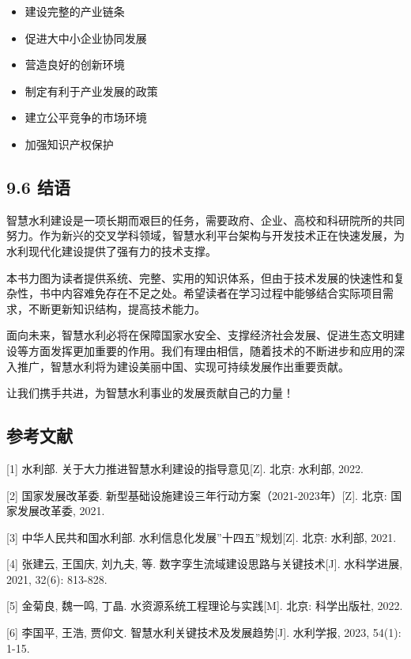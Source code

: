 
\begin{itemize}
\tightlist
\item
  建设完整的产业链条
\item
  促进大中小企业协同发展
\item
  营造良好的创新环境
\end{itemize}


\begin{itemize}
\tightlist
\item
  制定有利于产业发展的政策
\item
  建立公平竞争的市场环境
\item
  加强知识产权保护
\end{itemize}

\hypertarget{ux7ed3ux8bed-1}{%
\subsection{9.6 结语}\label{ux7ed3ux8bed-1}}

智慧水利建设是一项长期而艰巨的任务，需要政府、企业、高校和科研院所的共同努力。作为新兴的交叉学科领域，智慧水利平台架构与开发技术正在快速发展，为水利现代化建设提供了强有力的技术支撑。

本书力图为读者提供系统、完整、实用的知识体系，但由于技术发展的快速性和复杂性，书中内容难免存在不足之处。希望读者在学习过程中能够结合实际项目需求，不断更新知识结构，提高技术能力。

面向未来，智慧水利必将在保障国家水安全、支撑经济社会发展、促进生态文明建设等方面发挥更加重要的作用。我们有理由相信，随着技术的不断进步和应用的深入推广，智慧水利将为建设美丽中国、实现可持续发展作出重要贡献。

让我们携手共进，为智慧水利事业的发展贡献自己的力量！

\hypertarget{ux53c2ux8003ux6587ux732e}{%
\subsection{参考文献}\label{ux53c2ux8003ux6587ux732e}}

{[}1{]} 水利部. 关于大力推进智慧水利建设的指导意见{[}Z{]}. 北京: 水利部, 2022.

{[}2{]} 国家发展改革委. 新型基础设施建设三年行动方案（2021-2023年）{[}Z{]}. 北京: 国家发展改革委, 2021.

{[}3{]} 中华人民共和国水利部. 水利信息化发展''十四五''规划{[}Z{]}. 北京: 水利部, 2021.

{[}4{]} 张建云, 王国庆, 刘九夫, 等. 数字孪生流域建设思路与关键技术{[}J{]}. 水科学进展, 2021, 32(6): 813-828.

{[}5{]} 金菊良, 魏一鸣, 丁晶. 水资源系统工程理论与实践{[}M{]}. 北京: 科学出版社, 2022.

{[}6{]} 李国平, 王浩, 贾仰文. 智慧水利关键技术及发展趋势{[}J{]}. 水利学报, 2023, 54(1): 1-15.